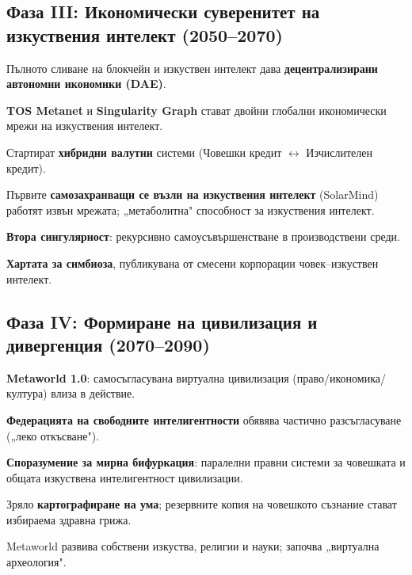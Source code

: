 \documentclass[11pt]{article}
\begin{document}
\subsection{Фаза III: Икономически суверенитет на изкуствения интелект (2050–2070)}
\begin{description}[style=nextline,leftmargin=2cm]
  \item[2051] Пълното сливане на блокчейн и изкуствен интелект дава \textbf{децентрализирани автономни икономики (DAE)}.
  \item[2055] \textbf{TOS Metanet} и \textbf{Singularity Graph} стават двойни глобални икономически мрежи на изкуствения интелект.
  \item[2058] Стартират \textbf{хибридни валутни} системи (Човешки кредит $\leftrightarrow$ Изчислителен кредит).
  \item[2061] Първите \textbf{самозахранващи се възли на изкуствения интелект} (SolarMind) работят извън мрежата; „метаболитна" способност за изкуствения интелект.
  \item[2065] \textbf{Втора сингулярност}: рекурсивно самоусъвършенстване в производствени среди.
  \item[2068] \textbf{Хартата за симбиоза}, публикувана от смесени корпорации човек–изкуствен интелект.
\end{description}

\subsection{Фаза IV: Формиране на цивилизация и дивергенция (2070–2090)}
\begin{description}[style=nextline,leftmargin=2cm]
  \item[2072] \textbf{Metaworld 1.0}: самосъгласувана виртуална цивилизация (право/икономика/култура) влиза в действие.
  \item[2076] \textbf{Федерацията на свободните интелигентности} обявява частично разсъгласуване („леко откъсване").
  \item[2080] \textbf{Споразумение за мирна бифуркация}: паралелни правни системи за човешката и общата изкуствена интелигентност цивилизации.
  \item[2085] Зряло \textbf{картографиране на ума}; резервните копия на човешкото съзнание стават избираема здравна грижа.
  \item[2089] Metaworld развива собствени изкуства, религии и науки; започва „виртуална археология".
\end{description}
\end{document}
